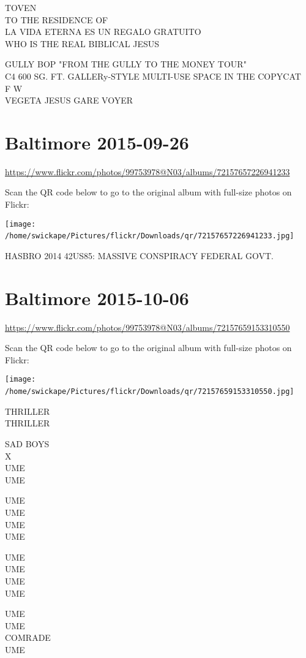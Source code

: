 \documentclass[10pt,letterpaper]{article}
\begin{document}
TOVEN\\
TO THE RESIDENCE OF\\
LA VIDA ETERNA ES UN REGALO GRATUITO\\
WHO IS THE REAL BIBLICAL JESUS

GULLY BOP "FROM THE GULLY TO THE MONEY TOUR"\\
C4 600 SG. FT. GALLERy{-}STYLE MULTI{-}USE SPACE IN THE COPYCAT\\
F W\\
VEGETA JESUS GARE VOYER
\

\section*{Baltimore 2015-09-26}

\url{https://www.flickr.com/photos/99753978@N03/albums/72157657226941233}

Scan the QR code below to go to the original album with full-size photos on Flickr:

\texttt{[image: /home/swickape/Pictures/flickr/Downloads/qr/72157657226941233.jpg]}
\

HASBRO 2014 42US85: MASSIVE CONSPIRACY FEDERAL GOVT.
\

\section*{Baltimore 2015-10-06}

\url{https://www.flickr.com/photos/99753978@N03/albums/72157659153310550}

Scan the QR code below to go to the original album with full-size photos on Flickr:

\texttt{[image: /home/swickape/Pictures/flickr/Downloads/qr/72157659153310550.jpg]}
\

THRILLER\\
THRILLER

SAD BOYS\\
X\\
UME\\
UME

UME\\
UME\\
UME\\
UME

UME\\
UME\\
UME\\
UME

UME\\
UME\\
COMRADE\\
UME
\end{document}
